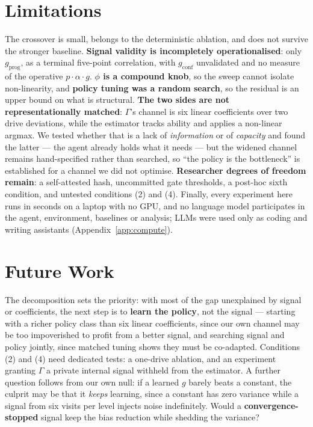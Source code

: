 \documentclass{article}
\begin{document}
\section{Limitations}
\label{sec:limitations}

The crossover is small, belongs to the deterministic ablation, and does not survive the stronger baseline. \textbf{Signal validity is incompletely operationalised}: only $g_{\text{prog}}$, as a terminal five-point correlation, with $g_{\text{conf}}$ unvalidated and no measure of the operative $p\cdot\alpha\cdot g$. \textbf{$\phi$ is a compound knob}, so the sweep cannot isolate non-linearity, and \textbf{policy tuning was a random search}, so the residual is an upper bound on what is structural. \textbf{The two sides are not representationally matched}: $\Gamma$'s channel is six linear coefficients over two drive deviations, while the estimator tracks ability and applies a non-linear argmax. We tested whether that is a lack of \emph{information} or of \emph{capacity} and found the latter --- the agent already holds what it needs --- but the widened channel remains hand-specified rather than searched, so ``the policy is the bottleneck'' is established for a channel we did not optimise. \textbf{Researcher degrees of freedom remain}: a self-attested hash, uncommitted gate thresholds, a post-hoc sixth condition, and untested conditions (2) and (4). Finally, every experiment here runs in seconds on a laptop with no GPU, and no language model participates in the agent, environment, baselines or analysis; LLMs were used only as coding and writing assistants (Appendix~\ref{app:compute}).

\section{Future Work}

The decomposition sets the priority: with most of the gap unexplained by signal or coefficients, the next step is to \textbf{learn the policy}, not the signal --- starting with a richer policy class than six linear coefficients, since our own channel may be too impoverished to profit from a better signal, and searching signal and policy jointly, since matched tuning shows they must be co-adapted. Conditions (2) and (4) need dedicated tests: a one-drive ablation, and an experiment granting $\Gamma$ a private internal signal withheld from the estimator. A further question follows from our own null: if a learned $g$ barely beats a constant, the culprit may be that it \emph{keeps} learning, since a constant has zero variance while a signal from six visits per level injects noise indefinitely. Would a \textbf{convergence-stopped} signal keep the bias reduction while shedding the variance?
\end{document}
